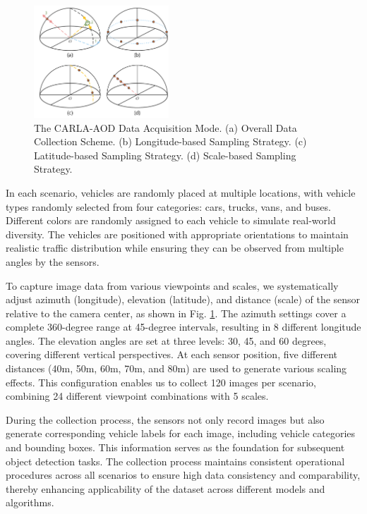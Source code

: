 \documentclass[lettersize,journal]{IEEEtran}
\begin{document}
\begin{figure}[!t]
    \centering
    \includegraphics[width=0.45\textwidth]{fig/Acquisition.pdf}
    \caption{The CARLA-AOD Data Acquisition Mode. (a) Overall Data Collection Scheme. (b) Longitude-based Sampling Strategy. (c) Latitude-based Sampling Strategy. (d) Scale-based Sampling Strategy.}
    \label{Acquisition}
\end{figure}

In each scenario, vehicles are randomly placed at multiple locations, with vehicle types randomly selected from four categories: cars, trucks, vans, and buses. Different colors are randomly assigned to each vehicle to simulate real-world diversity. The vehicles are positioned with appropriate orientations to maintain realistic traffic distribution while ensuring they can be observed from multiple angles by the sensors.

To capture image data from various viewpoints and scales, we systematically adjust azimuth (longitude), elevation (latitude), and distance (scale) of the sensor relative to the camera center, as shown in Fig. \ref{Acquisition}. The azimuth settings cover a complete 360-degree range at 45-degree intervals, resulting in 8 different longitude angles. The elevation angles are set at three levels: 30, 45, and 60 degrees, covering different vertical perspectives. At each sensor position, five different distances (40m, 50m, 60m, 70m, and 80m) are used to generate various scaling effects. This configuration enables us to collect 120 images per scenario, combining 24 different viewpoint combinations with 5 scales.

During the collection process, the sensors not only record images but also generate corresponding vehicle labels for each image, including vehicle categories and bounding boxes. This information serves as the foundation for subsequent object detection tasks. The collection process maintains consistent operational procedures across all scenarios to ensure high data consistency and comparability, thereby enhancing applicability of the dataset across different models and algorithms.
\end{document}
